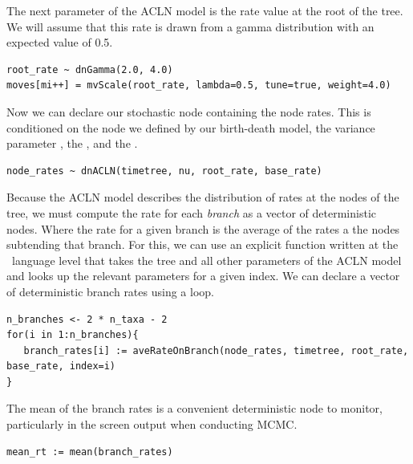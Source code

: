 The next parameter of the ACLN model is the rate value at the root of the tree. 
We will assume that this rate is drawn from a gamma distribution with an expected value of 0.5.
{\tt \begin{snugshade*}
\begin{lstlisting}
root_rate ~ dnGamma(2.0, 4.0)
moves[mi++] = mvScale(root_rate, lambda=0.5, tune=true, weight=4.0)
\end{lstlisting}
\end{snugshade*}}

Now we can declare our stochastic node containing the node rates. 
This is conditioned on the  node we defined by our birth-death model, the variance parameter , the , and the .
{\tt \begin{snugshade*}
\begin{lstlisting}
node_rates ~ dnACLN(timetree, nu, root_rate, base_rate)
\end{lstlisting}
\end{snugshade*}}

Because the ACLN model describes the distribution of rates at the nodes of the tree, we must compute the rate for each \textit{branch} as a vector of deterministic nodes. Where the rate for a given branch is the average of the rates a the nodes subtending that branch.
For this, we can use an explicit function written at the \Rev~language level that takes the tree and all other parameters of the ACLN model and looks up the relevant parameters for a given index. 
We can declare a vector of deterministic branch rates using a  loop.
{\tt \begin{snugshade*}
\begin{lstlisting}
n_branches <- 2 * n_taxa - 2
for(i in 1:n_branches){
   branch_rates[i] := aveRateOnBranch(node_rates, timetree, root_rate, base_rate, index=i)
}
\end{lstlisting}
\end{snugshade*}}

The mean of the branch rates is a convenient deterministic node to monitor, particularly in the screen output when conducting MCMC.
{\tt \begin{snugshade*}
\begin{lstlisting}
mean_rt := mean(branch_rates) 
\end{lstlisting}
\end{snugshade*}}

